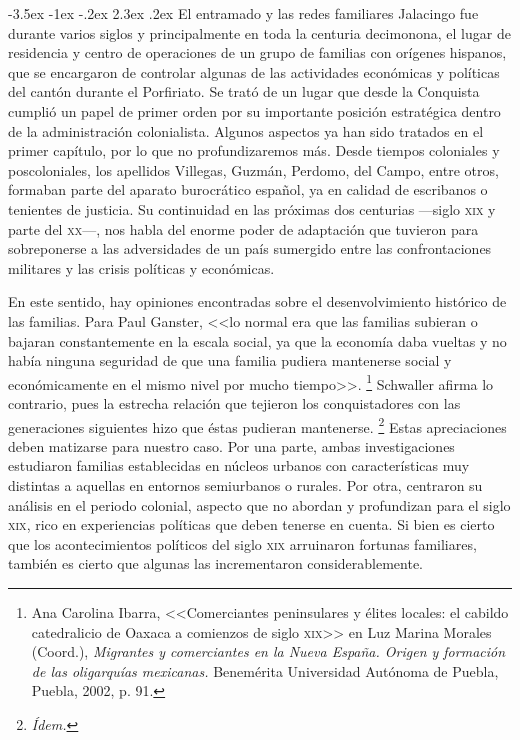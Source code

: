 \documentclass[14pt,twoside,final]{extbook} %
\makeatletter
\let\oldfootnote\footnote
\renewcommand\footnote[1]{%
\oldfootnote{\hspace{1mm}#1}}
\renewcommand\section{\@startsection {section}{1}{\z@}%
                                     {-3.5ex \@plus -1ex \@minus -.2ex}%
                                     {2.3ex \@plus .2ex}%
                                     {\normalfont\large\bfseries\sc}}
\makeatother
\begin{document}
\section{El entramado y las redes familiares}\label{sec:entramado-y-redes-familiares}
Jalacingo fue durante varios siglos y principalmente en toda la centuria decimonona, el lugar de residencia y centro de operaciones de un grupo de familias con orígenes hispanos, que se encargaron de controlar algunas de las actividades económicas y políticas del cantón durante el Porfiriato. Se trató de un lugar que desde la Conquista cumplió un papel de primer orden por su importante posición estratégica dentro de la administración colonialista. Algunos aspectos ya han sido tratados en el primer capítulo, por lo que no profundizaremos más. Desde tiempos coloniales y poscoloniales, los apellidos Villegas, Guzmán, Perdomo, del Campo, entre otros, formaban parte del aparato burocrático español, ya en calidad de escribanos o tenientes de justicia. Su continuidad en las próximas dos centurias ---siglo \textsc{xix} y parte del \textsc{xx}---, nos habla del enorme poder de adaptación que tuvieron para sobreponerse a las adversidades de un país sumergido entre las confrontaciones militares y las crisis políticas y económicas. \pagebreak[4]

En este sentido, hay opiniones encontradas sobre el desenvolvimiento histórico de las familias. Para Paul Ganster, <<lo normal era que las familias subieran o bajaran constantemente en la escala social, ya que la economía daba vueltas y no había ninguna seguridad de que una familia pudiera mantenerse social y económicamente en el mismo nivel por mucho tiempo>>.\footnote{Ana Carolina Ibarra, <<Comerciantes peninsulares y élites locales: el cabildo catedralicio de Oaxaca a comienzos de siglo \textsc{xix}>> en Luz Marina Morales (Coord.), \emph{Migrantes y comerciantes en la Nueva España. Origen y formación de las oligarquías mexicanas.} Benemérita Universidad Autónoma de Puebla, Puebla, 2002, p. 91.} Schwaller afirma lo contrario, pues la estrecha relación que tejieron los conquistadores con las generaciones siguientes hizo que éstas pudieran mantenerse.\footnote{\em Ídem.} Estas apreciaciones deben matizarse para nuestro caso. Por una parte, ambas investigaciones estudiaron familias establecidas en núcleos urbanos con características muy distintas a aquellas en entornos semiurbanos o rurales. Por otra, centraron su análisis en el periodo colonial, aspecto que no abordan y profundizan para el siglo \textsc{xix}, rico en experiencias políticas que deben tenerse en cuenta. Si bien es cierto que los acontecimientos políticos del siglo \textsc{xix} arruinaron fortunas familiares, también es cierto que algunas las incrementaron considerablemente.
\end{document}
